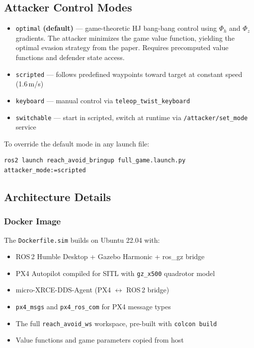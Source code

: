 \documentclass[11pt,a4paper]{article}
\begin{document}
\subsection{Attacker Control Modes}

\begin{itemize}[noitemsep]
    \item \texttt{optimal} \textbf{(default)} --- game-theoretic HJ bang-bang control using $\Phi_h$ and $\Phi_z$ gradients. The attacker minimizes the game value function, yielding the optimal evasion strategy from the paper. Requires precomputed value functions and defender state access.
    \item \texttt{scripted} --- follows predefined waypoints toward target at constant speed (1.6\,m/s)
    \item \texttt{keyboard} --- manual control via \texttt{teleop\_twist\_keyboard}
    \item \texttt{switchable} --- start in scripted, switch at runtime via \texttt{/attacker/set\_mode} service
\end{itemize}

To override the default mode in any launch file:
\begin{lstlisting}[style=bashstyle]
ros2 launch reach_avoid_bringup full_game.launch.py attacker_mode:=scripted
\end{lstlisting}

\subsection{Architecture Details}

\subsubsection{Docker Image}

The \texttt{Dockerfile.sim} builds on Ubuntu 22.04 with:
\begin{itemize}[noitemsep]
    \item ROS\,2 Humble Desktop + Gazebo Harmonic + ros\_gz bridge
    \item PX4 Autopilot compiled for SITL with \texttt{gz\_x500} quadrotor model
    \item micro-XRCE-DDS-Agent (PX4 $\leftrightarrow$ ROS\,2 bridge)
    \item \texttt{px4\_msgs} and \texttt{px4\_ros\_com} for PX4 message types
    \item The full \texttt{reach\_avoid\_ws} workspace, pre-built with \texttt{colcon build}
    \item Value functions and game parameters copied from host
\end{itemize}
\end{document}
